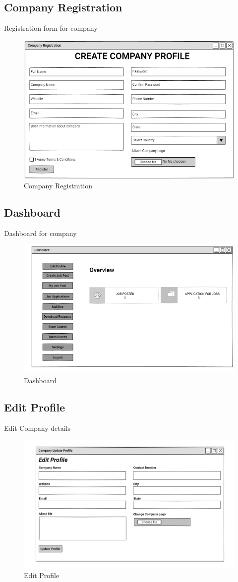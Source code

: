 \documentclass[a4paper,12pt]{report}
\begin{document}
\subsection {Company Registration}
Registration form for company
\begin{figure}[bph]
	\centering
	\includegraphics[width=.8\linewidth ]{img/company/company_registration}
	\caption{Company Registration}
\end{figure}
\pagebreak
\subsection {Dashboard}
Dashboard for company
\begin{figure}[bph]
	\centering
	\includegraphics[width=1\linewidth]{img/company/company_home_page}
	\caption{Dashboard}
\end{figure}

\pagebreak
\subsection {Edit Profile}
Edit Company details
\begin{figure}[bph]
	\centering
	\includegraphics[width=.6\linewidth]{img/company/cmpnyprflupdt}
		\caption{Edit Profile}
\end{figure}
\end{document}
